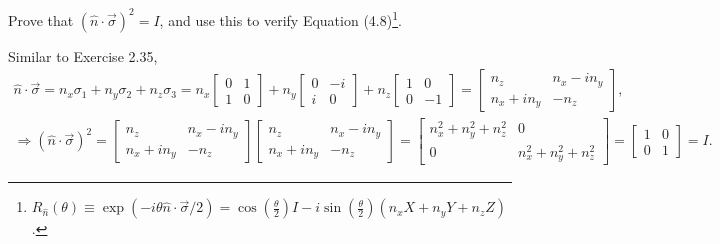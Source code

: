 \documentclass[en]{sol-man}
\begin{document}
\begin{exe}
    Prove that $(\hat{n}\cdot\vec{\sigma})^2=I$, and use this to verify Equation (4.8)\footnote{$R_{\hat{n}}(\theta)\equiv\exp(-i\theta\hat{n}\cdot\vec{\sigma}/2)=\cos\left(\frac{\theta}{2}\right)I-i\sin\left(\frac{\theta}{2}\right)(n_xX+n_yY+n_zZ)$.}.
\end{exe}
\begin{pf}
    Similar to Exercise 2.35,
    \begin{gather}
        \hat{n}\cdot\vec{\sigma}=n_x\sigma_1+n_y\sigma_2+n_z\sigma_3=n_x\begin{bmatrix}
            0&1\\
            1&0
        \end{bmatrix}+n_y\begin{bmatrix}
            0&-i\\
            i&0
        \end{bmatrix}+n_z\begin{bmatrix}
            1&0\\
            0&-1
        \end{bmatrix}=\begin{bmatrix}
            n_z&n_x-in_y\\
            n_x+in_y&-n_z
        \end{bmatrix},\\
        \Longrightarrow(\hat{n}\cdot\vec{\sigma})^2=\begin{bmatrix}
            n_z&n_x-in_y\\
            n_x+in_y&-n_z
        \end{bmatrix}\begin{bmatrix}
            n_z&n_x-in_y\\
            n_x+in_y&-n_z
        \end{bmatrix}=\begin{bmatrix}
            n_x^2+n_y^2+n_z^2&0\\
            0&n_x^2+n_y^2+n_z^2
        \end{bmatrix}=\begin{bmatrix}
            1&0\\
            0&1
        \end{bmatrix}=I.
    \end{gather}


\end{pf}
\end{document}
